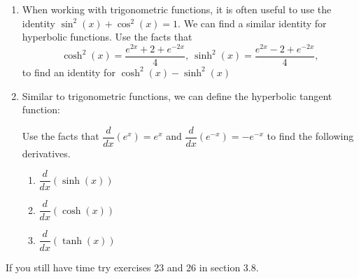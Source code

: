 \documentclass[11pt]{article}
\begin{document}
\begin{enumerate}
  \newpage

\item When working with trigonometric functions, it is often useful to
  use the identity $\sin^2 (x) + \cos^2 (x) = 1$. We can find a similar
  identity for hyperbolic functions. Use the facts that
  \[
  \cosh^2(x)=\dfrac{e^{2x}+2+e^{-2x}}{4},\:
  \sinh^2(x)=\dfrac{e^{2x}-2+e^{-2x}}{4},
  \]
  to find an identity for $\cosh^2(x)-\sinh^2(x)$
  \vfill

  \newpage

\item Similar to trigonometric functions, we can define the hyperbolic
  tangent function:
  \begin{center}
  \end{center}
  Use the facts that $\dfrac{d}{dx}\left(e^x\right)=e^x$ and
  $\dfrac{d}{dx}\left(e^{-x}\right)=-e^{-x}$ to find the following
  derivatives.
  \begin{enumerate}
  \item $\dfrac{d}{dx}(\sinh(x))$
    \vfill
  \item $\dfrac{d}{dx}(\cosh(x))$
    \vfill
  \item $\dfrac{d}{dx}(\tanh(x))$
    \vfill
  \end{enumerate}

\end{enumerate}

If you still have time try exercises 23 and 26 in section 3.8.
\end{document}

